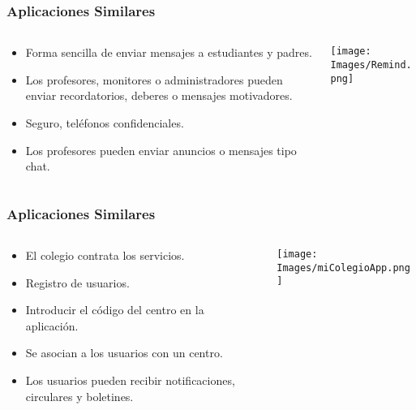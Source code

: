 \begin{frame}
	\frametitle{Aplicaciones Similares}
	\begin{columns}
		\begin{column}{0.6\textwidth}
				\begin{itemize}
					\item Forma sencilla de enviar mensajes a estudiantes y padres.
					\item Los profesores, monitores o administradores pueden enviar recordatorios, deberes o mensajes motivadores.
					\item Seguro, teléfonos confidenciales.
					\item Los profesores pueden enviar anuncios o mensajes tipo chat.
				\end{itemize}
			\endblock{}
		\end{column}
		\begin{column}{0.4\textwidth}
			\hfill \texttt{[image: Images/Remind.png]}
		\end{column}
	\end{columns}
\end{frame}


\begin{frame}
	\frametitle{Aplicaciones Similares}
	\begin{columns}
		\begin{column}{0.6\textwidth}
			\block{\it miColegioApp}
			\begin{itemize}
				\item El colegio contrata los servicios.
				\item Registro de usuarios.
				\item Introducir el código del centro en la aplicación.
				\item Se asocian a los usuarios con un centro.
				\item Los usuarios pueden recibir notificaciones, circulares y boletines.
			\end{itemize}
			\endblock{}
		\end{column}
		\begin{column}{0.4\textwidth}
			\hfill \texttt{[image: Images/miColegioApp.png]}
		\end{column}
	\end{columns}
\end{frame}


